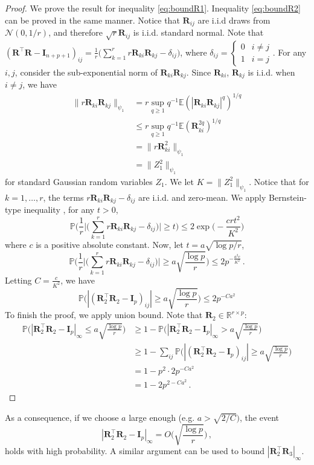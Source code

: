 \documentclass[11pt]{article}
\newcommand{\bI}{\boldsymbol{I}}
\newcommand{\bR}{\boldsymbol{R}}
\newcommand{\mbR}{\mathbb{R}}
\newcommand{\mcN}{\mathcal{N}}
\newcommand{\Expected}{\mathbb{E}}
\newcommand{\Prob}{\mathbb{P}}
\begin{document}
\begin{proof} 
We prove the result for inequality \eqref{eq:boundR1}. Inequality \eqref{eq:boundR2} can be proved in the same manner. Notice that $\bR_{ij}$ are i.i.d draws from $\mcN(0,1/r)$, and therefore $\sqrt{r}\bR_{ij}$ is i.i.d. standard normal. Note that $(\bR^\top\bR-\bI_{n+p+1})_{ij} = \frac{1}{r}\bigg(\sum_{k=1}^r r\bR_{ki}\bR_{kj}-\delta_{ij}\bigg)$, where $\delta_{ij}=\begin{cases}
    0 & i\neq j\\
    1 & i=j
\end{cases}$. 
For any $i,j$, consider the sub-exponential norm of $\bR_{ki}\bR_{kj}$. Since $\bR_{ki}$, $\bR_{kj}$ is i.i.d. when $i\neq j$, we have 
\begin{align*}
\|r\bR_{ki}\bR_{kj}\|_{\psi_1}&= r\sup_{q\ge1} q^{-1} \Expected(|\bR_{ki}\bR_{kj}|^q)^{1/q}\\
&\le r\sup_{q\ge1} q^{-1} \Expected(\bR_{ki}^{2q})^{1/q}\\
&= \|r\bR_{ki}^2\|_{\psi_1}\\
&= \|Z_1^2\|_{\psi_1}
\end{align*}
for standard Gaussian random variables $Z_1$. We let $K = \|Z_1^2\|_{\psi_1}$. Notice that for $k=1,\dotsc,r$, the terms $r\bR_{ki}\bR_{kj} - \delta_{ij}$ are i.i.d. and zero-mean. We apply Bernstein-type inequality \citep[Theorem 2.9.1]{vershynin11}, for any $t>0$,
\[ \Prob\bigg(\frac{1}{r}\bigg|\bigg(\sum_{k=1}^r r\bR_{ki}\bR_{kj}-\delta_{ij}\bigg)\bigg|\geq t\bigg)\leq 2\exp\bigg(-\frac{crt^2}{K^2}\bigg)\]
where $c$ is a positive absolute constant. 
Now, let $t = a\sqrt{\log p/r}$,
\begin{equation}\label{eq:boundR3}
    \Prob\bigg(\frac{1}{r}\bigg|\bigg(\sum_{k=1}^r r\bR_{ki}\bR_{kj}-\delta_{ij}\bigg)\bigg|\geq a\sqrt{\frac{\log p}{r}}\bigg)\leq 2p^{-\frac{a^2c}{K^2}}\,.
\end{equation}
Letting $C=\frac{c}{K^2}$, we have
\[\Prob\bigg(|(\bR_2^\top \bR_2-\bI_p)_{ij}| \geq a\sqrt{\frac{\log p}{r}}\bigg)\leq 2p^{-Ca^2}\]
To finish the proof, we apply union bound. Note that $\bR_2\in\mbR^{r\times p}$:
\begin{align*}
    \Prob\bigg(|\bR_2^\top \bR_2-\bI_p|_\infty \leq a \sqrt{\frac{\log p}{r}}\bigg)&\geq  1- \Prob\bigg(|\bR_2^\top \bR_2-\bI_p|_\infty > a \sqrt{\frac{\log p}{r}}\bigg)\\
        &\geq  1- \sum_{ij}\Prob\bigg(|(\bR_2^\top \bR_2-\bI_p)_{ij}| \geq a\sqrt{\frac{\log p}{r}}\bigg)\\
        &= 1-p^2\cdot 2p^{-Ca^2}\\
        &=  1- 2p^{2-Ca^2}\,.
\end{align*}
\end{proof}
As a consequence, if we choose $a$ large enough (e.g. $a>\sqrt{2/C})$, the event 
\begin{equation}\label{eq:boundR}
    |\bR_2^\top \bR_2 - \bI_p|_\infty = O\bigg(\sqrt{\frac{\log p}{r}}\bigg)\,,
\end{equation}
holds with high probability. A similar argument can be used to bound $|\bR_2^\top \bR_3|_\infty$.
\end{document}
